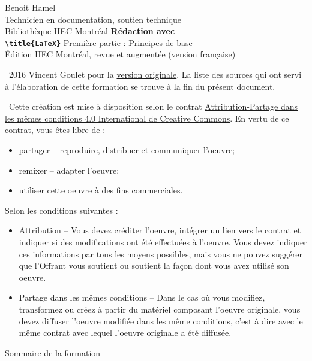 \scriptsize

\begin{frame}
	Benoit Hamel \\
	Technicien en documentation, soutien technique \\
	Bibliothèque HEC Montréal
	\vfill
	{
		\Huge\bfseries
		Rédaction avec \\
		\texttt{\textbackslash title\{\textrm{\LaTeX}\}}
	}
	\vfill
	Première partie : Principes de base \\
	Édition HEC Montréal, revue et augmentée (version française)
\end{frame}

\begin{frame}
	\faCopyright\ 2016 Vincent Goulet pour la 
	\href{https://ctan.org/pkg/formation-latex-ul}{version originale}. La liste des sources qui ont 
	servi à l'élaboration de cette formation se trouve à la fin du présent document.
	
	\faCreativeCommons\ Cette création est mise à disposition selon le contrat 
	\href{http://creativecommons.org/licenses/by-sa/4.0/deed.fr}{%
	Attribution-Partage dans les mêmes conditions 4.0 International de Creative Commons}. 
	En vertu de ce contrat, vous êtes libre de :
	
	\begin{itemize}
		\item partager -- reproduire, distribuer et communiquer l’oeuvre;
		\item remixer -- adapter l’oeuvre;
		\item utiliser cette oeuvre à des fins commerciales.
	\end{itemize}

	Selon les conditions suivantes :
	
	\begin{itemize}
		\item Attribution -- Vous devez créditer l’oeuvre, intégrer un lien vers le contrat et indiquer si des modifications ont été effectuées à l’oeuvre. Vous devez indiquer ces informations par tous les moyens possibles, mais vous ne pouvez suggérer que l’Offrant vous soutient ou soutient la façon dont vous avez utilisé son oeuvre.
		\item Partage dans les mêmes conditions -- Dans le cas où vous modifiez, transformez ou créez à partir du matériel composant l’oeuvre
		originale, vous devez diffuser l’oeuvre modifiée dans les même conditions, c’est à dire avec le même contrat avec lequel l’oeuvre originale a été diffusée.
	\end{itemize}
\end{frame}

\begin{frame}{Sommaire de la formation}
	\begin{columns}[onlytextwidth]
		\begin{column}{.49\textwidth}
			\tableofcontents[sections={1-3}]
		\end{column}
		\begin{column}{.49\textwidth}
			\tableofcontents[sections={4}]
		\end{column}
	\end{columns}
\end{frame}